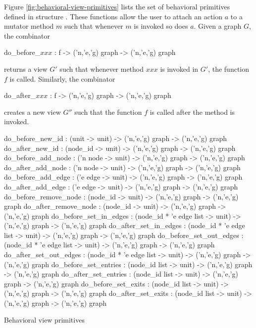 Figure \ref{fig:behavioral-view-primitives} lists
the set of behavioral primitives defined
in structure .  
These functions allow the user
to attach an action $a$ to a mutator method $m$ such that whenever $m$
is invoked so does $a$.  Given a graph $G$, the combinator 
\begin{SML}
   do_before_\(xxx\) : f -> ('n,'e,'g) graph -> ('n,'e,'g) graph
\end{SML}
\noindent returns a view $G'$ such that whenever method $xxx$ is invoked
in $G'$, the function $f$ is called. 
Similarly, the combinator 
\begin{SML}
   do_after_\(xxx\) : f -> ('n,'e,'g) graph -> ('n,'e,'g) graph
\end{SML}
\noindent creates a new view $G''$ such that the function $f$
is called after the method is invoked.
\begin{Figure}
\begin{boxit}
\begin{SML}
 do_before_new_id : (unit -> unit) -> ('n,'e,'g) graph -> ('n,'e,'g) graph
 do_after_new_id : (node_id -> unit) -> ('n,'e,'g) graph -> ('n,'e,'g) graph
 do_before_add_node : ('n node -> unit) -> ('n,'e,'g) graph -> ('n,'e,'g) graph
 do_after_add_node : ('n node -> unit) -> ('n,'e,'g) graph -> ('n,'e,'g) graph
 do_before_add_edge : ('e edge -> unit) -> ('n,'e,'g) graph -> ('n,'e,'g) graph
 do_after_add_edge : ('e edge -> unit) -> ('n,'e,'g) graph -> ('n,'e,'g) graph
 do_before_remove_node : (node_id -> unit) -> ('n,'e,'g) graph -> ('n,'e,'g) graph
 do_after_remove_node : (node_id -> unit) -> ('n,'e,'g) graph -> ('n,'e,'g) graph 
 do_before_set_in_edges : (node_id * 'e edge list -> unit) -> 
    ('n,'e,'g) graph -> ('n,'e,'g) graph
 do_after_set_in_edges : (node_id * 'e edge list -> unit) -> 
    ('n,'e,'g) graph -> ('n,'e,'g) graph
 do_before_set_out_edges : (node_id * 'e edge list -> unit) -> 
    ('n,'e,'g) graph -> ('n,'e,'g) graph
 do_after_set_out_edges : (node_id * 'e edge list -> unit) -> 
    ('n,'e,'g) graph -> ('n,'e,'g) graph
 do_before_set_entries : (node_id list -> unit) -> ('n,'e,'g) graph -> ('n,'e,'g) graph
 do_after_set_entries : (node_id list -> unit) -> ('n,'e,'g) graph -> ('n,'e,'g) graph
 do_before_set_exits : (node_id list -> unit) -> ('n,'e,'g) graph -> ('n,'e,'g) graph
 do_after_set_exits : (node_id list -> unit) -> ('n,'e,'g) graph -> ('n,'e,'g) graph
\end{SML}
\end{boxit}
\label{fig:behavioral-view-primitives} 
\caption{Behavioral view primitives}
\end{Figure}

